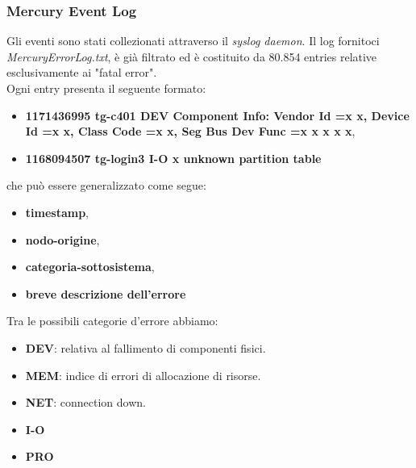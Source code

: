 \subsubsection{Mercury Event Log}
Gli eventi sono stati collezionati attraverso il \textit{syslog daemon}.
Il log fornitoci \textit{MercuryErrorLog.txt}, è già filtrato ed è costituito da 80.854 entries relative esclusivamente ai "fatal error".
\\Ogni entry presenta il seguente formato:
\begin{itemize}
	\item \textbf{1171436995 tg-c401 DEV Component Info: Vendor Id =x x, Device Id =x x, Class Code =x x, Seg Bus Dev Func =x x x x x},
	\item \textbf{1168094507 tg-login3 I-O x unknown partition table}
\end{itemize}
che può essere generalizzato come segue:
\\
\begin{itemize}
	\item \textbf{timestamp},
	\item \textbf{nodo-origine},
	\item \textbf{categoria-sottosistema},
	\item \textbf{breve descrizione dell'errore}
\end{itemize}
Tra le possibili categorie d'errore abbiamo:
\begin{itemize}
	\item \textbf{DEV}: relativa al fallimento di componenti fisici.
	\item \textbf{MEM}: indice di errori di allocazione di risorse.
	\item \textbf{NET}: connection down.
	\item \textbf{I-O}
	\item \textbf{PRO}
\end{itemize}

\newpage


